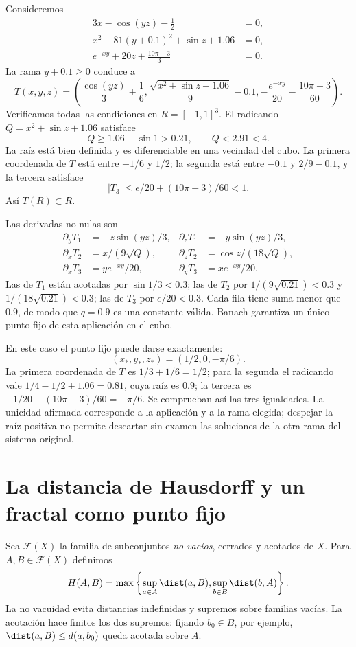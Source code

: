 \begin{ejemplo}\label{ch11:sistema3}
Consideremos
\begin{align*}
 3x-\cos(yz)-\tfrac12&=0,\\
 x^2-81(y+0.1)^2+\sin z+1.06&=0,\\
 e^{-xy}+20z+\tfrac{10\pi-3}{3}&=0.
\end{align*}
La rama $y+0.1\geq0$ conduce a
\[
 T(x,y,z)=\left(\frac{\cos(yz)}3+\frac16,
 \frac{\sqrt{x^2+\sin z+1.06}}9-0.1,
 -\frac{e^{-xy}}{20}-\frac{10\pi-3}{60}\right).
\]
Verificamos todas las condiciones en $R=[-1,1]^3$. El radicando $Q=x^2+\sin z+1.06$ satisface
\[
 Q\geq1.06-\sin1>0.21,\qquad Q<2.91<4.
\]
La raíz está bien definida y es diferenciable en una vecindad del cubo. La primera coordenada de $T$ está entre $-1/6$ y $1/2$; la segunda está entre $-0.1$ y $2/9-0.1$, y la tercera satisface
\[
 |T_3|\leq e/20+(10\pi-3)/60<1.
\]
Así $T(R)\subset R$.

Las derivadas no nulas son
\begin{align*}
 \partial_yT_1&=-z\sin(yz)/3,&\partial_zT_1&=-y\sin(yz)/3,\\
 \partial_xT_2&=x/(9\sqrt Q),&\partial_zT_2&=\cos z/(18\sqrt Q),\\
 \partial_xT_3&=ye^{-xy}/20,&\partial_yT_3&=xe^{-xy}/20.
\end{align*}
Las de $T_1$ están acotadas por $\sin1/3<0.3$; las de $T_2$ por $1/(9\sqrt{0.21})<0.3$ y $1/(18\sqrt{0.21})<0.3$; las de $T_3$ por $e/20<0.3$. Cada fila tiene suma menor que $0.9$, de modo que $q=0.9$ es una constante válida. Banach garantiza un único punto fijo de esta aplicación en el cubo.

En este caso el punto fijo puede darse exactamente:
\[
 (x_*,y_*,z_*)=(1/2,0,-\pi/6).
\]
La primera coordenada de $T$ es $1/3+1/6=1/2$; para la segunda el radicando vale $1/4-1/2+1.06=0.81$, cuya raíz es $0.9$; la tercera es $-1/20-(10\pi-3)/60=-\pi/6$. Se comprueban así las tres igualdades. La unicidad afirmada corresponde a la aplicación y a la rama elegida; despejar la raíz positiva no permite descartar sin examen las soluciones de la otra rama del sistema original.
\end{ejemplo}

\section{La distancia de Hausdorff y un fractal como punto fijo}
Sea $\mathcal F(X)$ la familia de subconjuntos \emph{no vacíos}, cerrados y acotados de $X$. Para $A,B\in\mathcal F(X)$ definimos
\[
 H(A,B)=\max\left\{\sup_{a\in A}\dist(a,B),
                         \sup_{b\in B}\dist(b,A)\right\}.
\]
La no vacuidad evita distancias indefinidas y supremos sobre familias vacías. La acotación hace finitos los dos supremos: fijando $b_0\in B$, por ejemplo, $\dist(a,B)\leq d(a,b_0)$ queda acotada sobre $A$.


